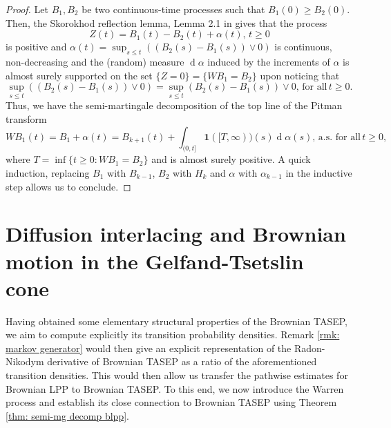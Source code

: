 \documentclass[11pt, reqno]{amsart}
\numberwithin{equation}{section}
\newcommand{\diff}{\ensuremath{\operatorname{d}\!}}
\begin{document}
\begin{proof}
    Let $B_1, B_2$ be two continuous-time processes such that $B_1(0)\ge B_2(0)$. Then, the Skorokhod reflection lemma, Lemma 2.1 in \cite{revuz2013continuous} gives that the process
    \begin{equation*}
        Z(t) = B_1(t)-B_2(t) + \alpha(t), \, t\ge 0
    \end{equation*}
    is positive and $\alpha(t) = \sup_{s\le t}((B_2(s)-B_1(s))\lor 0)$ is continuous, non-decreasing and the (random) measure $\diff \alpha$ induced by the increments of $\alpha$ is almost surely supported on the set $\{Z = 0\} = \{WB_1 = B_2\}$ upon noticing that 
    \begin{equation*}
        \sup_{s\le t}((B_2(s)-B_1(s))\lor 0) =  \sup_{s\le t}(B_2(s)-B_1(s))\lor 0,\, \text{for all}\, t\ge 0.
    \end{equation*}
    Thus, we have the semi-martingale decomposition of the top line of the Pitman transform 
    \begin{equation*}
          WB_1(t) = B_1 + \alpha(t) = B_{k+1}(t)+ \displaystyle\int_{(0,t]}\mathbf{1}([T,\infty))(s)\diff \alpha(s),\, \text{a.s. for all} \, t\ge 0, 
     \end{equation*}
     where $T = \inf\{t\ge 0:  WB_1 = B_2\}$ and is almost surely positive. A quick induction, replacing $B_1$ with $B_{k-1}$, $B_2$ with $H_{k}$ and $\alpha$ with $\alpha_{k-1}$ in the inductive step allows us to conclude.
\end{proof}

\section{Diffusion interlacing and Brownian motion in the Gelfand-Tsetslin cone}\label{sec: BM gelfand-tsetslin cone}
Having obtained some elementary structural properties of the Brownian TASEP, we aim to compute explicitly its transition probability densities. Remark \ref{rmk: markov generator} would then give an explicit representation of the Radon-Nikodym derivative of Brownian TASEP as a ratio of the aforementioned transition densities. This would then allow us transfer the pathwise estimates for Brownian LPP to Brownian TASEP. To this end, we now introduce the Warren process and establish its close connection to Brownian TASEP using Theorem \ref{thm: semi-mg decomp blpp}. 
\end{document}
